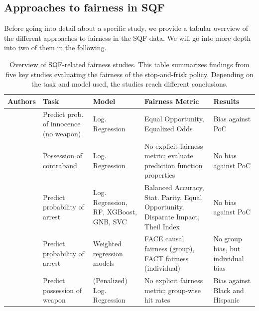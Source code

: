 \subsection{Approaches to fairness in SQF}

Before going into detail about a specific study, we provide a tabular overview of the different approaches to fairness in the SQF data. We will go into more depth into two of them in the following.

\begin{table}[h]
    \centering
        \begin{tabular}{|m{2cm}|m{3cm}|m{2.5cm}|m{3.5cm}|m{2.8cm}|}
            \hline
            \textbf{Authors} & \textbf{Task} & \textbf{Model} & \textbf{Fairness Metric} & \textbf{Results} \\
            \hline
            \cite{kallus2018} 
            & Predict prob. of innocence (no weapon) 
            & Log. Regression 
            & Equal Opportunity, Equalized Odds 
            & Bias against PoC \\ 
            \hline
            \cite{rambachan2016} 
            & Possession of contraband
            & Log. Regression 
            & No explicit fairness metric; evaluate prediction function properties 
            & No bias against PoC\\
            \hline
            \cite{Badr2022DTFANSP} 
            & Predict probability of arrest 
            & Log. Regression, RF, XGBoost, GNB, SVC 
            & Balanced Accuracy, Stat. Parity, Equal Opportunity, Disparate Impact, Theil Index 
            & No bias against PoC \\ 
            \hline
            \cite{Khademi2019FADMELC} 
            & Predict probability of arrest 
            & Weighted regression models
            & FACE causal fairness (group), FACT fairness (individual) 
            & No group bias, but individual bias \\ 
            \hline
            \cite{goel2016} 
            & Predict possession of weapon 
            & (Penalized) Log. Regression 
            & No explicit fairness metric; group-wise hit rates 
            & Bias against Black and Hispanic\\ 
            \hline
        \end{tabular}
        \caption{Overview of SQF-related fairness studies. This table summarizes findings from five key studies evaluating the fairness of the stop-and-frisk policy. Depending on the task and model used, the studies reach different conclusions.}
        \label{tab:sqf_summary}
\end{table}

